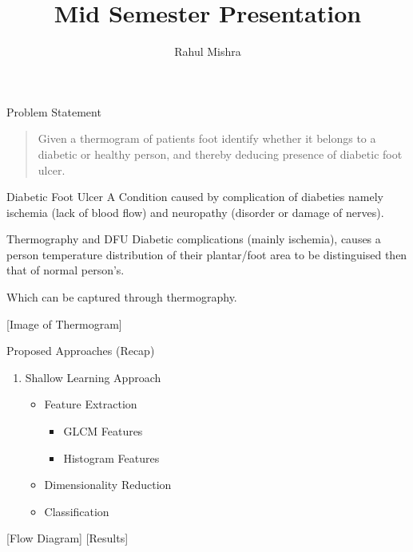 \documentclass[
  ignorenonframetext,
]{beamer}
\title{Mid Semester Presentation}
\author{Rahul Mishra}
\date{}
\providecommand{\tightlist}{%
  \setlength{\itemsep}{0pt}\setlength{\parskip}{0pt}}\usepackage{longtable,booktabs,array}
\begin{document}
\frame{\titlepage}


\begin{frame}{Problem Statement}
\label{problem-statement}
\begin{quote}
Given a thermogram of patients foot identify whether it belongs to a
diabetic or healthy person, and thereby deducing presence of diabetic
foot ulcer.
\end{quote}
\end{frame}

\begin{frame}{Diabetic Foot Ulcer}
\label{diabetic-foot-ulcer}
A Condition caused by complication of diabeties namely ischemia (lack of
blood flow) and neuropathy (disorder or damage of nerves).
\end{frame}

\begin{frame}{Thermography and DFU}
\label{thermography-and-dfu}
Diabetic complications (mainly ischemia), causes a person temperature
distribution of their plantar/foot area to be distinguised then that of
normal person's.

Which can be captured through thermography.

{[}Image of Thermogram{]}
\end{frame}

\begin{frame}{Proposed Approaches (Recap)}
\label{proposed-approaches-recap}
\begin{enumerate}
\tightlist
\item
  Shallow Learning Approach

  \begin{itemize}
  \tightlist
  \item
    Feature Extraction

    \begin{itemize}
    \tightlist
    \item
      GLCM Features
    \item
      Histogram Features
    \end{itemize}
  \item
    Dimensionality Reduction
  \item
    Classification
  \end{itemize}
\end{enumerate}

{[}Flow Diagram{]} {[}Results{]}
\end{frame}
\end{document}
